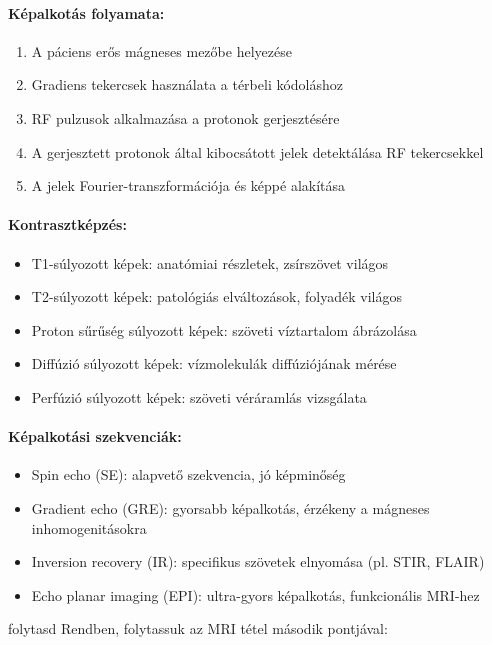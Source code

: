 \documentclass[a4paper,12pt]{article}
\begin{document}
\paragraph{Képalkotás folyamata:} \begin{enumerate} \item A páciens erős mágneses mezőbe helyezése \item Gradiens tekercsek használata a térbeli kódoláshoz \item RF pulzusok alkalmazása a protonok gerjesztésére \item A gerjesztett protonok által kibocsátott jelek detektálása RF tekercsekkel \item A jelek Fourier-transzformációja és képpé alakítása \end{enumerate}

\paragraph{Kontrasztképzés:} \begin{itemize} \item T1-súlyozott képek: anatómiai részletek, zsírszövet világos \item T2-súlyozott képek: patológiás elváltozások, folyadék világos \item Proton sűrűség súlyozott képek: szöveti víztartalom ábrázolása \item Diffúzió súlyozott képek: vízmolekulák diffúziójának mérése \item Perfúzió súlyozott képek: szöveti véráramlás vizsgálata \end{itemize}

\paragraph{Képalkotási szekvenciák:} \begin{itemize} \item Spin echo (SE): alapvető szekvencia, jó képminőség \item Gradient echo (GRE): gyorsabb képalkotás, érzékeny a mágneses inhomogenitásokra \item Inversion recovery (IR): specifikus szövetek elnyomása (pl. STIR, FLAIR) \item Echo planar imaging (EPI): ultra-gyors képalkotás, funkcionális MRI-hez \end{itemize}

folytasd
Rendben, folytassuk az MRI tétel második pontjával:
\end{document}
